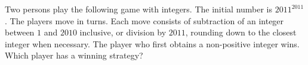 Two persons play the following game with integers. The initial number is $2011^{2011}$. The players move in turns. Each move consists of subtraction of an integer between $1$ and $2010$ inclusive, or division by $2011$,  rounding down to the closest integer when necessary. The player who first obtains a non-positive integer wins. Which player has a winning strategy?